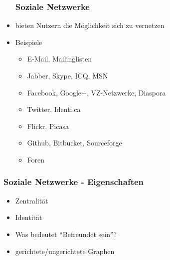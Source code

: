 \documentclass{beamer}
\begin{document}
\begin{frame}
  \begin{itemize}
  \frametitle{Soziale Netzwerke}
    \item<2-> bieten Nutzern die Möglichkeit sich zu vernetzen
    \item<3-> Beispiele
      \begin{itemize}
        \item<4-> E-Mail, Mailinglisten
        \item<5-> Jabber, Skype, ICQ, MSN
        \item<6-> Facebook, Google+, VZ-Netzwerke, Diaspora
        \item<7-> Twitter, Identi.ca
        \item<8-> Flickr, Picasa
        \item<9-> Github, Bitbucket, Sourceforge
        \item<10-> Foren
      \end{itemize}
  \end{itemize}
\end{frame}

\begin{frame}
  \frametitle{Soziale Netzwerke - Eigenschaften}
  \begin{itemize}
    \item<2-> Zentralität
    \item<3-> Identität
    \item<4-> Was bedeutet "`Befreundet sein"'?
    \item<5-> gerichtete/ungerichtete Graphen
  \end{itemize}
\end{frame}
\end{document}
